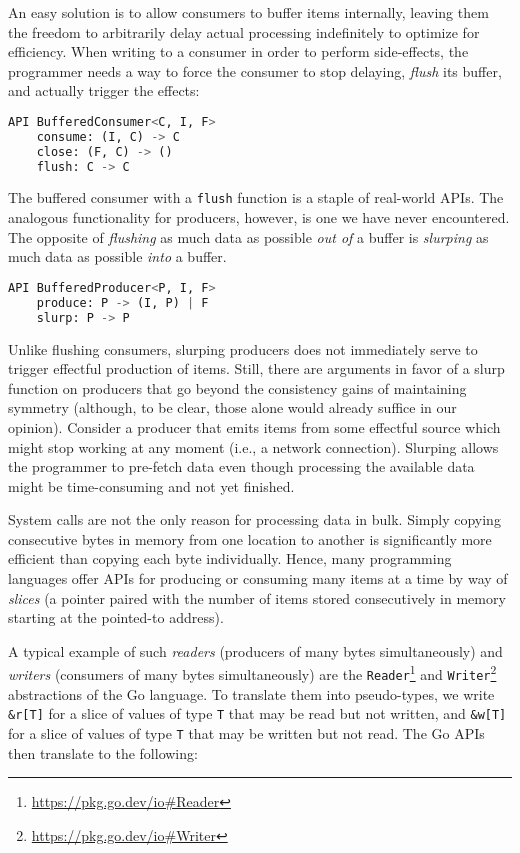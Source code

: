 \documentclass[sigplan,screen,10pt,anonymous,review]{acmart}
\begin{document}
An easy solution is to allow consumers to buffer items internally, leaving them the freedom to arbitrarily delay actual processing indefinitely to optimize for efficiency. When writing to a consumer in order to perform side-effects, the programmer needs a way to force the consumer to stop delaying, \textit{flush} its buffer, and actually trigger the effects:

\begin{lstlisting}[language=Python]
API BufferedConsumer<C, I, F>
    consume: (I, C) -> C
    close: (F, C) -> ()
    flush: C -> C
\end{lstlisting}

The buffered consumer with a \texttt{flush} function is a staple of real-world APIs. The analogous functionality for producers, however, is one we have never encountered. The opposite of \textit{flushing} as much data as possible \textit{out of} a buffer is \textit{slurping} as much data as possible \textit{into} a buffer.

\begin{lstlisting}[language=Python]
API BufferedProducer<P, I, F>
    produce: P -> (I, P) | F
    slurp: P -> P
\end{lstlisting}

Unlike flushing consumers, slurping producers does not immediately serve to trigger effectful production of items. Still, there are arguments in favor of a slurp function on producers that go beyond the consistency gains of maintaining symmetry (although, to be clear, those alone would already suffice in our opinion). Consider a producer that emits items from some effectful source which might stop working at any moment (i.e., a network connection). Slurping allows the programmer to pre-fetch data even though processing the available data might be time-consuming and not yet finished.

System calls are not the only reason for processing data in bulk. Simply copying consecutive bytes in memory from one location to another is significantly more efficient than copying each byte individually. Hence, many programming languages offer APIs for producing or consuming many items at a time by way of \textit{slices} (a pointer paired with the number of items stored consecutively in memory starting at the pointed-to address).

A typical example of such \textit{readers} (producers of many bytes simultaneously) and \textit{writers} (consumers of many bytes simultaneously) are the \texttt{Reader}\footnote{\url{https://pkg.go.dev/io\#Reader}} and \texttt{Writer}\footnote{\url{https://pkg.go.dev/io\#Writer}} abstractions of the Go language. To translate them into pseudo-types, we write \texttt{\&r[T]} for a slice of values of type \texttt{T} that may be read but not written, and \texttt{\&w[T]} for a slice of values of type \texttt{T} that may be written but not read. The Go APIs then translate to the following:
\end{document}
